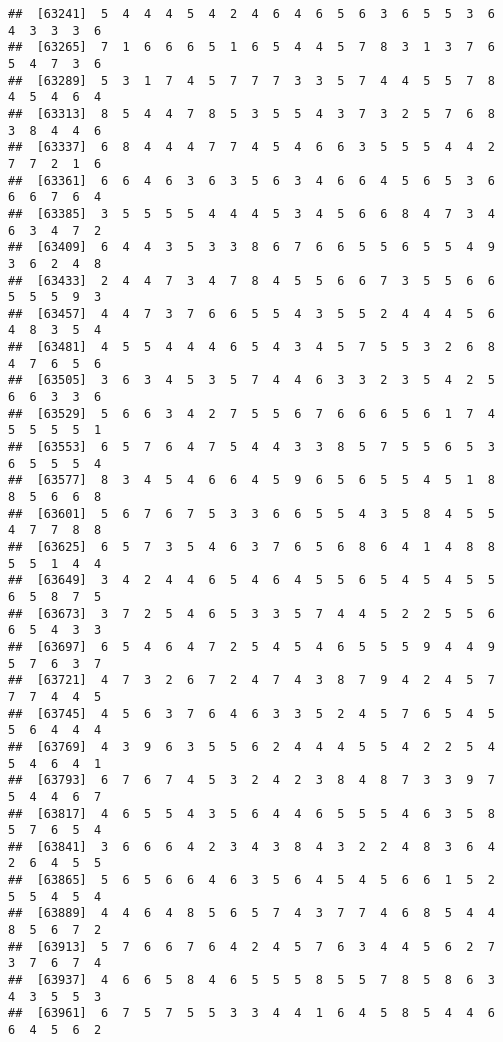 \documentclass[
]{book}
\begin{document}
\begin{verbatim}
##  [63241]  5  4  4  4  5  4  2  4  6  4  6  5  6  3  6  5  5  3  6  4  3  3  3  6
##  [63265]  7  1  6  6  6  5  1  6  5  4  4  5  7  8  3  1  3  7  6  5  4  7  3  6
##  [63289]  5  3  1  7  4  5  7  7  7  3  3  5  7  4  4  5  5  7  8  4  5  4  6  4
##  [63313]  8  5  4  4  7  8  5  3  5  5  4  3  7  3  2  5  7  6  8  3  8  4  4  6
##  [63337]  6  8  4  4  4  7  7  4  5  4  6  6  3  5  5  5  4  4  2  7  7  2  1  6
##  [63361]  6  6  4  6  3  6  3  5  6  3  4  6  6  4  5  6  5  3  6  6  6  7  6  4
##  [63385]  3  5  5  5  5  4  4  4  5  3  4  5  6  6  8  4  7  3  4  6  3  4  7  2
##  [63409]  6  4  4  3  5  3  3  8  6  7  6  6  5  5  6  5  5  4  9  3  6  2  4  8
##  [63433]  2  4  4  7  3  4  7  8  4  5  5  6  6  7  3  5  5  6  6  5  5  5  9  3
##  [63457]  4  4  7  3  7  6  6  5  5  4  3  5  5  2  4  4  4  5  6  4  8  3  5  4
##  [63481]  4  5  5  4  4  4  6  5  4  3  4  5  7  5  5  3  2  6  8  4  7  6  5  6
##  [63505]  3  6  3  4  5  3  5  7  4  4  6  3  3  2  3  5  4  2  5  6  6  3  3  6
##  [63529]  5  6  6  3  4  2  7  5  5  6  7  6  6  6  5  6  1  7  4  5  5  5  5  1
##  [63553]  6  5  7  6  4  7  5  4  4  3  3  8  5  7  5  5  6  5  3  6  5  5  5  4
##  [63577]  8  3  4  5  4  6  6  4  5  9  6  5  6  5  5  4  5  1  8  8  5  6  6  8
##  [63601]  5  6  7  6  7  5  3  3  6  6  5  5  4  3  5  8  4  5  5  4  7  7  8  8
##  [63625]  6  5  7  3  5  4  6  3  7  6  5  6  8  6  4  1  4  8  8  5  5  1  4  4
##  [63649]  3  4  2  4  4  6  5  4  6  4  5  5  6  5  4  5  4  5  5  6  5  8  7  5
##  [63673]  3  7  2  5  4  6  5  3  3  5  7  4  4  5  2  2  5  5  6  6  5  4  3  3
##  [63697]  6  5  4  6  4  7  2  5  4  5  4  6  5  5  5  9  4  4  9  5  7  6  3  7
##  [63721]  4  7  3  2  6  7  2  4  7  4  3  8  7  9  4  2  4  5  7  7  7  4  4  5
##  [63745]  4  5  6  3  7  6  4  6  3  3  5  2  4  5  7  6  5  4  5  5  6  4  4  4
##  [63769]  4  3  9  6  3  5  5  6  2  4  4  4  5  5  4  2  2  5  4  5  4  6  4  1
##  [63793]  6  7  6  7  4  5  3  2  4  2  3  8  4  8  7  3  3  9  7  5  4  4  6  7
##  [63817]  4  6  5  5  4  3  5  6  4  4  6  5  5  5  4  6  3  5  8  5  7  6  5  4
##  [63841]  3  6  6  6  4  2  3  4  3  8  4  3  2  2  4  8  3  6  4  2  6  4  5  5
##  [63865]  5  6  5  6  6  4  6  3  5  6  4  5  4  5  6  6  1  5  2  5  5  4  5  4
##  [63889]  4  4  6  4  8  5  6  5  7  4  3  7  7  4  6  8  5  4  4  8  5  6  7  2
##  [63913]  5  7  6  6  7  6  4  2  4  5  7  6  3  4  4  5  6  2  7  3  7  6  7  4
##  [63937]  4  6  6  5  8  4  6  5  5  5  8  5  5  7  8  5  8  6  3  4  3  5  5  3
##  [63961]  6  7  5  7  5  5  3  3  4  4  1  6  4  5  8  5  4  4  6  6  4  5  6  2

\end{verbatim}
\end{document}
